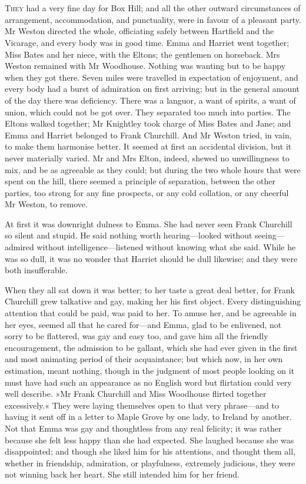 \chapter[Chapter \thechapter]{}
\lettrine[lines=4,lraise=0.3]{T}{hey} had a very fine day for Box Hill; and all the other outward circumstances of arrangement, accommodation, and punctuality, were in favour of a pleasant party. Mr Weston directed the whole, officiating safely between Hartfield and the Vicarage, and every body was in good time. Emma and Harriet went together; Miss Bates and her niece, with the Eltons; the gentlemen on horseback. Mrs Weston remained with Mr Woodhouse. Nothing was wanting but to be happy when they got there. Seven miles were travelled in expectation of enjoyment, and every body had a burst of admiration on first arriving; but in the general amount of the day there was deficiency. There was a languor, a want of spirits, a want of union, which could not be got over. They separated too much into parties. The Eltons walked together; Mr Knightley took charge of Miss Bates and Jane; and Emma and Harriet belonged to Frank Churchill. And Mr Weston tried, in vain, to make them harmonise better. It seemed at first an accidental division, but it never materially varied. Mr and Mrs Elton, indeed, shewed no unwillingness to mix, and be as agreeable as they could; but during the two whole hours that were spent on the hill, there seemed a principle of separation, between the other parties, too strong for any fine prospects, or any cold collation, or any cheerful Mr Weston, to remove.

At first it was downright dulness to Emma. She had never seen Frank Churchill so silent and stupid. He said nothing worth hearing—looked without seeing—admired without intelligence—listened without knowing what she said. While he was so dull, it was no wonder that Harriet should be dull likewise; and they were both insufferable.

When they all sat down it was better; to her taste a great deal better, for Frank Churchill grew talkative and gay, making her his first object. Every distinguishing attention that could be paid, was paid to her. To amuse her, and be agreeable in her eyes, seemed all that he cared for—and Emma, glad to be enlivened, not sorry to be flattered, was gay and easy too, and gave him all the friendly encouragement, the admission to be gallant, which she had ever given in the first and most animating period of their acquaintance; but which now, in her own estimation, meant nothing, though in the judgment of most people looking on it must have had such an appearance as no English word but flirtation could very well describe. »Mr Frank Churchill and Miss Woodhouse flirted together excessively.« They were laying themselves open to that very phrase—and to having it sent off in a letter to Maple Grove by one lady, to Ireland by another. Not that Emma was gay and thoughtless from any real felicity; it was rather because she felt less happy than she had expected. She laughed because she was disappointed; and though she liked him for his attentions, and thought them all, whether in friendship, admiration, or playfulness, extremely judicious, they were not winning back her heart. She still intended him for her friend.


